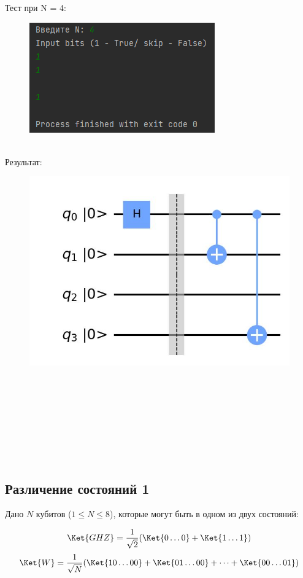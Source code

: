 \documentclass{article}
\begin{document}
Тест при N = 4:
\begin{figure}[h]
        \centering
        \includegraphics{pictures/test3.1.png}
   \end{figure} \\ 
   
Результат:
\begin{figure}[h]
        \centering
        \includegraphics{pictures/task3_1.jpg}
   \end{figure} \\ \\ \\ \\ \\ \\ \\ 

\subsection{Различение состояний 1}

Дано $N$ кубитов ($1 \le N \le 8$), которые могут быть в одном из двух состояний:

$$\Ket{GHZ} = \frac{1}{\sqrt2}(\Ket{0\dots0} +\Ket{1\dots1})$$
$$\Ket{W} = \frac{1}{\sqrt N}(\Ket{10\dots00}+\Ket{01\dots00} + \dots +\Ket{00\dots01})$$
\end{document}
